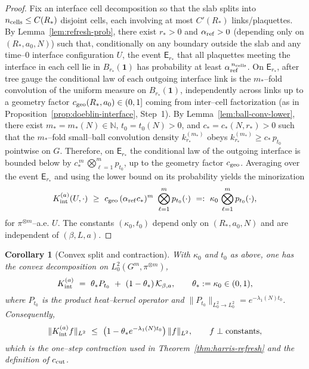 \documentclass[11pt]{amsart}
\theoremstyle{plain}
\newtheorem{corollary}[theorem]{Corollary}
\theoremstyle{definition}
\theoremstyle{remark}
\begin{document}
\begin{proof}
Fix an interface cell decomposition so that the slab splits into $n_{\rm cells}\le C(R_*)$ disjoint cells, each involving at most $C'(R_*)$ links/plaquettes. By Lemma~\ref{lem:refresh-prob}, there exist $r_*>0$ and $\alpha_{\rm ref}>0$ (depending only on $(R_*,a_0,N)$) such that, conditionally on any boundary outside the slab and any time–$0$ interface configuration $U$, the event $\mathsf E_{r_*}$ that all plaquettes meeting the interface in each cell lie in $B_{r_*}(\mathbf 1)$ has probability at least $\alpha_{\rm ref}^{\,n_{\rm cells}}$. On $\mathsf E_{r_*}$, after tree gauge the conditional law of each outgoing interface link is the $m_*$–fold convolution of the uniform measure on $B_{r_*}(\mathbf 1)$, independently across links up to a geometry factor $c_{\rm geo}(R_*,a_0)\in(0,1]$ coming from inter–cell factorization (as in Proposition~\ref{prop:doeblin-interface}, Step~1). By Lemma~\ref{lem:ball-conv-lower}, there exist $m_*=m_*(N)\in\mathbb N$, $t_0=t_0(N)>0$, and $c_*=c_*(N,r_*)>0$ such that the $m_*$–fold small–ball convolution density $k_{r_*}^{(m_*)}$ obeys $k_{r_*}^{(m_*)}\ge c_*\,p_{t_0}$ pointwise on $G$. Therefore, on $\mathsf E_{r_*}$ the conditional law of the outgoing interface is bounded below by $c_*^{\,m}\,\bigotimes_{\ell=1}^m p_{t_0}$, up to the geometry factor $c_{\rm geo}$. Averaging over the event $\mathsf E_{r_*}$ and using the lower bound on its probability yields the minorization
\[
  K_{\rm int}^{(a)}(U,\cdot)\ \ge\ c_{\rm geo}\, (\alpha_{\rm ref} c_*)^{m}\ \bigotimes_{\ell=1}^m p_{t_0}(\cdot)\ =:\ \kappa_0\, \bigotimes_{\ell=1}^m p_{t_0}(\cdot),
\]
for $\pi^{\otimes m}$–a.e. $U$. The constants $(\kappa_0,t_0)$ depend only on $(R_*,a_0,N)$ and are independent of $(\beta,L,a)$.
\end{proof}

\begin{corollary}[Convex split and contraction]\label{cor:convex-split}
With $\kappa_0$ and $t_0$ as above, one has the convex decomposition on $L^2_0(G^m,\pi^{\otimes m})$,
\[
  K_{\rm int}^{(a)}\ =\ \theta_* P_{t_0}\ +\ (1-\theta_*)\,\mathcal{K}_{\beta,a},\qquad \theta_*:=\kappa_0\in(0,1),
\]
where $P_{t_0}$ is the product heat–kernel operator and $\|P_{t_0}\|_{L^2_0\to L^2_0}=e^{-\lambda_1(N) t_0}$. Consequently,
\[
  \|K_{\rm int}^{(a)} f\|_{L^2}\ \le\ \big(1-\theta_* e^{-\lambda_1(N) t_0}\big)\,\|f\|_{L^2},\qquad f\perp \text{constants},
\]
which is the one–step contraction used in Theorem~\ref{thm:harris-refresh} and the definition of $c_{\rm cut}$.
\end{corollary}
\end{document}

